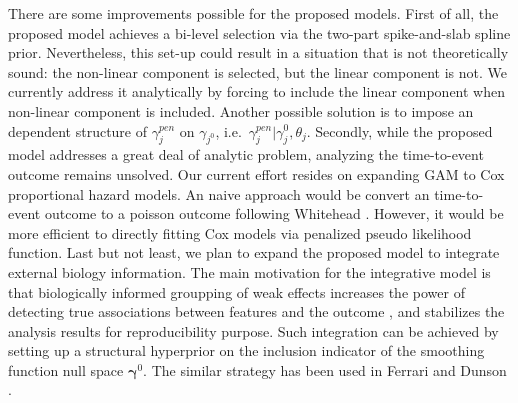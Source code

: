\documentclass[AMA,STIX1COL,]{WileyNJD-v2}
\begin{document}
There are some improvements possible for the proposed models. First of
all, the proposed model achieves a bi-level selection via the two-part
spike-and-slab spline prior. Nevertheless, this set-up could result in a
situation that is not theoretically sound: the non-linear component is
selected, but the linear component is not. We currently address it
analytically by forcing to include the linear component when non-linear
component is included. Another possible solution is to impose an
dependent structure of \(\gamma_{j}^{pen}\) on \(\gamma_{j^{0}}\),
i.e.~\(\gamma_j^{pen}|\gamma_{j}^{0}, \theta_j\). Secondly, while the
proposed model addresses a great deal of analytic problem, analyzing the
time-to-event outcome remains unsolved. Our current effort resides on
expanding GAM to Cox proportional hazard models. An naive approach would
be convert an time-to-event outcome to a poisson outcome following
Whitehead \citep{Whitehead1980}. However, it would be more efficient to
directly fitting Cox models via penalized pseudo likelihood function.
Last but not least, we plan to expand the proposed model to integrate
external biology information. The main motivation for the integrative
model is that biologically informed groupping of weak effects increases
the power of detecting true associations between features and the
outcome \citep{Peterson2016}, and stabilizes the analysis results for
reproducibility purpose. Such integration can be achieved by setting up
a structural hyperprior on the inclusion indicator of the smoothing
function null space \(\boldsymbol{\gamma}^0\). The similar strategy has
been used in Ferrari and Dunson \citep{Ferrari2020}.


\end{document}
